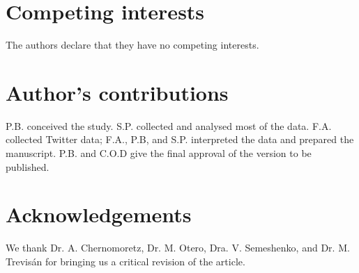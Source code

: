 \documentclass{bmcart}
\begin{document}

\begin{backmatter}

\section*{Competing interests}
  The authors declare that they have no competing interests.

\section*{Author's contributions}
P.B. conceived the study. S.P. collected and analysed most of the data. F.A. collected Twitter data; F.A., P.B, and S.P. interpreted the data and prepared the manuscript. P.B. and C.O.D  give the final approval of the version to be published.

\section*{Acknowledgements}
  We thank Dr. A. Chernomoretz, Dr. M. Otero, Dra. V. Semeshenko, and Dr. M. Trevis\'an for bringing us a critical revision of the article.




\end{backmatter}
\end{document}
